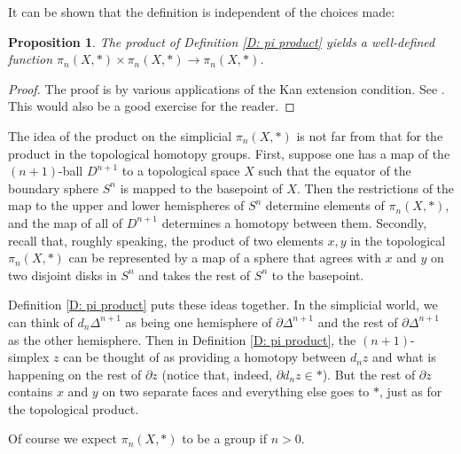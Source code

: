 \documentclass[12pt]{article}
\theoremstyle{plain}
\newtheorem{proposition}[theorem]{Proposition}
\theoremstyle{definition}
\newcommand{\bd}{\partial}
\begin{document}
It can be shown that the definition is independent of the choices made:

\begin{proposition}
The product of Definition \ref{D: pi product} yields a well-defined function $\pi_n(X,*)\times \pi_n(X,*)\to \pi_n(X,*)$.
\end{proposition}
\begin{proof}
The proof is by various applications of the Kan extension condition. See \cite[Lemma 4.2]{MAY67}. This would also be a good exercise for the reader.
\end{proof}


The idea of the product on the simplicial $\pi_n(X,*)$ is not far from that for the product in the topological homotopy groups. First, suppose one has a map of the $(n+1)$-ball $D^{n+1}$ to a topological space $X$ such that the equator of the boundary sphere $S^n$ is mapped to the basepoint of $X$. Then the restrictions of the map to the  upper and lower hemispheres of $S^{n}$ determine elements of $\pi_n(X,*)$, and the map of all of $D^{n+1}$ determines a homotopy between them. Secondly, recall that, roughly speaking, the product of two elements $x,y$ in the topological $\pi_n(X,*)$ can be represented by a map of a sphere that agrees with $x$ and $y$ on two disjoint disks in $S^n$ and takes the rest of $S^n$ to the basepoint.

Definition \ref{D: pi product} puts these ideas together. 
In the simplicial world, we can think of $d_n\Delta^{n+1}$ as being one hemisphere of $\bd \Delta^{n+1}$ and the rest of $\bd \Delta^{n+1}$ as the other hemisphere. Then in  Definition \ref{D: pi product}, the $(n+1)$-simplex $z$ can be thought of as providing a homotopy between $d_nz$ and what is happening on the rest of $\bd z$ (notice that, indeed, $\bd d_nz\in *$). But the rest of $\bd z$ contains $x$ and $y$ on two separate faces and everything else goes to $*$, just as for the topological product.

Of course we expect $\pi_n(X,*)$ to be a group if $n>0$.
\end{document}
